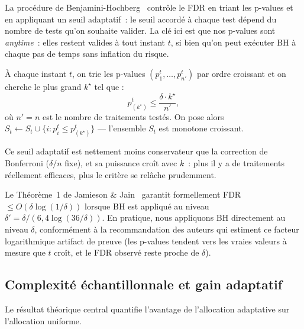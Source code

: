 \documentclass[10.5pt,a4paper]{article}
\begin{document}
\begin{intuition}
La proc\'edure de Benjamini-Hochberg~\cite{benjamini1995} contr\^ole le
FDR en triant les p-values et en appliquant un seuil adaptatif~: le seuil
accord\'e \`a chaque test d\'epend du nombre de tests qu'on souhaite
valider. La cl\'e ici est que nos p-values sont \emph{anytime}~: elles
restent valides \`a tout instant $t$, si bien qu'on peut ex\'ecuter BH
\`a chaque pas de temps sans inflation du risque.
\end{intuition}

\`A chaque instant $t$, on trie les p-values $(p_1^t, \ldots, p_{n'}^t)$
par ordre croissant et on cherche le plus grand $k^\star$ tel que :
\[
  p_{(k^\star)}^t \leq \frac{\delta \cdot k^\star}{n'},
\]
o\`u $n' = n$ est le nombre de traitements test\'es. On pose alors
$S_t \leftarrow S_t \cup \{i : p_i^t \leq
p_{(k^\star)}^t\}$ --- l'ensemble $S_t$ est monotone croissant.

Ce seuil adaptatif est nettement moins conservateur que la correction de
Bonferroni ($\delta/n$ fixe), et sa puissance cro\^it avec $k$~: plus il
y a de traitements r\'eellement efficaces, plus le crit\`ere se rel\^ache
prudemment.

\begin{remarque}
Le Th\'eor\`eme~1 de Jamieson \& Jain~\cite{jamieson2019} garantit formellement FDR
$\leq O(\delta\log(1/\delta))$ lorsque BH est appliqu\'e au niveau
$\delta' = \delta/(6{,}4\log(36/\delta))$. En pratique, nous appliquons
BH directement au niveau $\delta$, conform\'ement \`a la recommandation
des auteurs qui estiment ce facteur logarithmique artifact de preuve
(les p-values tendent vers les vraies valeurs \`a mesure que $t$ cro\^it,
et le FDR observ\'e reste proche de $\delta$).
\end{remarque}


\subsection{Complexit\'e \'echantillonnale et gain adaptatif}

Le r\'esultat th\'eorique central quantifie l'avantage de l'allocation
adaptative sur l'allocation uniforme.
\end{document}

